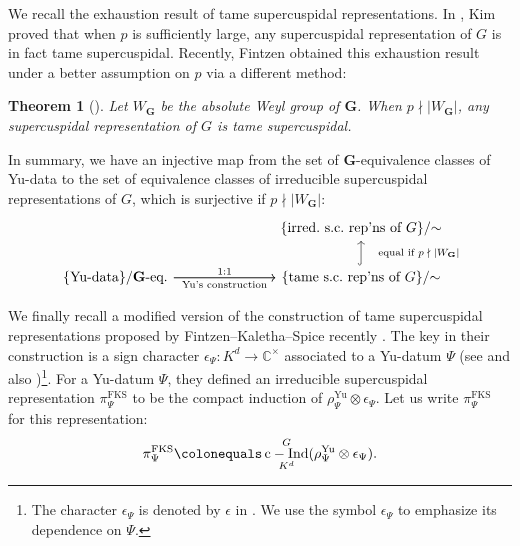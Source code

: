 \documentclass{amsart}
\newcommand{\FKS}{\mathrm{FKS}}
\newcommand{\Yu}{\mathrm{Yu}}
\newcommand{\C}{\mathbb{C}}
\newcommand{\bfG}{\mathbf{G}}
\DeclareMathOperator{\cInd}{c-Ind}
\theoremstyle{plain}
\newtheorem{thm}{Theorem}[section]
\theoremstyle{definition}
\theoremstyle{remark}
\theoremstyle{theorem}
\begin{document}
We recall the exhaustion result of tame supercuspidal representations.
In \cite{Kim07}, Kim proved that when $p$ is sufficiently large, any supercuspidal representation of $G$ is in fact tame supercuspidal.
Recently, Fintzen obtained this exhaustion result under a better assumption on $p$ via a different method:
\begin{thm}[{\cite[Theorem 8.1]{Fin21-Ann}}]\label{thm:Fintzen}
Let $W_{\bfG}$ be the absolute Weyl group of $\bfG$.
When $p\nmid|W_{\bfG}|$, any supercuspidal representation of $G$ is tame supercuspidal.
\end{thm}

In summary, we have an injective map from the set of $\bfG$-equivalence classes of Yu-data to the set of equivalence classes of irreducible supercuspidal representations of $G$, which is surjective if $p\nmid|W_{\bfG}|$:
\begin{equation*}
    \begin{tikzcd}[column sep=1in]
        & \{\text{irred.\ s.c.\ rep'ns of $G$}\}/{\sim}\\
        \{\text{Yu-data}\}/\text{$\bfG$-eq.} \ar{r}[above]{1:1} \ar{r}[below]{\text{Yu's construction}} & \{\text{tame s.c.\ rep'ns of $G$}\}/{\sim}\ar[hookrightarrow]{u}[right]{\quad \text{equal if $p\nmid|W_{\bfG}|$}}
    \end{tikzcd}
\end{equation*}

We finally recall a modified version of the construction of tame supercuspidal representations proposed by Fintzen--Kaletha--Spice recently \cite{FKS21}.
The key in their construction is a sign character $\epsilon_{\Psi}\colon K^{d}\rightarrow\C^{\times}$ associated to a Yu-datum $\Psi$ (see \cite[Definition 4.1.10]{FKS21} and also \cite[15 page]{FKS21})\footnote{The character $\epsilon_{\Psi}$ is denoted by $\epsilon$ in \cite{FKS21}. We use the symbol $\epsilon_{\Psi}$ to emphasize its dependence on $\Psi$.}.
For a Yu-datum $\Psi$, they defined an irreducible supercuspidal representation $\pi_{\Psi}^{\FKS}$ to be the compact induction of $\rho_{\Psi}^{\Yu}\otimes\epsilon_{\Psi}$.
Let us write $\pi_{\Psi}^{\FKS}$ for this representation:
\[
\pi_{\Psi}^{\FKS}\colonequals \cInd_{K^{d}}^{G}(\rho_{\Psi}^{\Yu}\otimes\epsilon_{\Psi}).
\]
\end{document}
